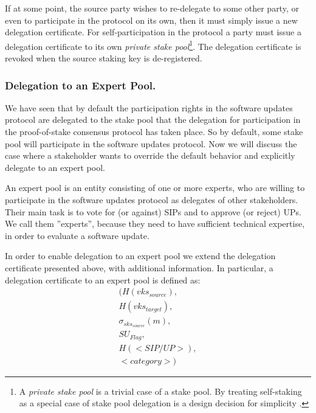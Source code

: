 If at some point, the source party wishes to re-delegate to some other party, or even to participate in the protocol on its own, then it must simply issue a new delegation certificate. For self-participation in the protocol a party must issue a delegation certificate to its own \emph{private stake pool}\footnote{A \emph{private stake pool} is a trivial case of a stake pool. By treating self-staking as a special case of stake pool delegation is a design decision for simplicity \cite{deldesign}.}. The delegation certificate is revoked when the source staking key is de-registered.

\subsubsection*{Delegation to an Expert Pool.}
We have seen that by default the participation rights in the software updates protocol are delegated to the stake pool that the delegation for participation in the proof-of-stake consensus protocol has taken place. So by default, some stake pool will participate in the software updates protocol. Now we will discuss the case where a stakeholder wants to override the default behavior and explicitly delegate to an expert pool.

An expert pool is an entity consisting of one or more experts, who are willing to participate in the software updates protocol as delegates of other stakeholders. Their main task is to vote for (or against) SIPs and to approve (or reject) UPs. We call them ''experts'', because they need to have sufficient technical expertise, in order to evaluate a software update.

In order to enable delegation to an expert pool we extend the delegation certificate presented above, with additional information. In particular, a delegation certificate to an expert pool is defined as:
\begin{align*}
(H(vks_{source}), \\
 H(vks_{target}), \\
 \sigma_{sks_{source}}(m), \\
 SU_{Flag}, \\
 H(<SIP/UP>), \\
 <category>)
\end{align*}

